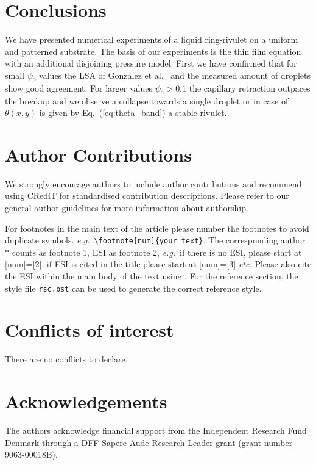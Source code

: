 \documentclass[twoside,twocolumn,9pt]{article}
\begin{document}
\section{Conclusions}
We have presented numerical experiments of a liquid ring-rivulet on a uniform and patterned substrate. 
The basis of our experiments is the thin film equation with an additional disjoining pressure model.
First we have confirmed that for small $\psi_0$ values the LSA of Gonz{\'a}lez et al.~\cite{gonzalezStabilityLiquidRing2013} and the measured amount of droplets show good agreement.
For larger values $\psi_0 > 0.1$ the capillary retraction outpaces the breakup and we observe a collapse towards a single droplet or in case of $\theta(x,y)$ is given by Eq.~(\ref{eq:theta_band}) a stable rivulet.



\section*{Author Contributions}
We strongly encourage authors to include author contributions and recommend using \href{https://casrai.org/credit/}{CRediT} for standardised contribution descriptions. Please refer to our general \href{https://www.rsc.org/journals-books-databases/journal-authors-reviewers/author-responsibilities/}{author guidelines} for more information about authorship.

For footnotes in the main text of the article please number the footnotes to avoid duplicate symbols. \textit{e.g.}\ \texttt{\textbackslash footnote[num]\{your text\}}. The corresponding author $\ast$ counts as footnote 1, ESI as footnote 2, \textit{e.g.}\ if there is no ESI, please start at [num]=[2], if ESI is cited in the title please start at [num]=[3] \textit{etc.} Please also cite the ESI within the main body of the text using \dag. For the reference section, the style file \texttt{rsc.bst} can be used to generate the correct reference style.

\section*{Conflicts of interest}
There are no conflicts to declare.

\section*{Acknowledgements}
The authors acknowledge financial support from the Independent Research Fund Denmark through a DFF Sapere Aude Research Leader grant (grant number 9063-00018B).
\end{document}
